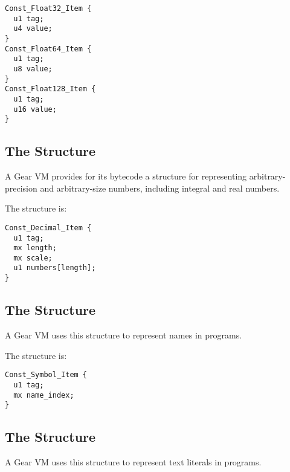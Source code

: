 \begin{minipage}{\linewidth}
\begin{lstlisting}
Const_Float32_Item {
  u1 tag;
  u4 value;
}
Const_Float64_Item {
  u1 tag;
  u8 value;
}
Const_Float128_Item {
  u1 tag;
  u16 value;
}
\end{lstlisting}
\end{minipage}






\subsection{The  Structure}

A Gear VM provides for its bytecode a structure for representing arbitrary-precision and arbitrary-size numbers, including integral and real numbers. 

The  structure is:

\begin{minipage}{\linewidth}
\begin{lstlisting}
Const_Decimal_Item {
  u1 tag;
  mx length;
  mx scale;
  u1 numbers[length];
}
\end{lstlisting}
\end{minipage}






\subsection{The  Structure}

A Gear VM uses this structure to represent names in programs. 

The  structure is:

\begin{minipage}{\linewidth}
\begin{lstlisting}
Const_Symbol_Item {
  u1 tag;
  mx name_index;
}
\end{lstlisting}
\end{minipage}






\subsection{The  Structure}

A Gear VM uses this structure to represent text literals in programs. 

